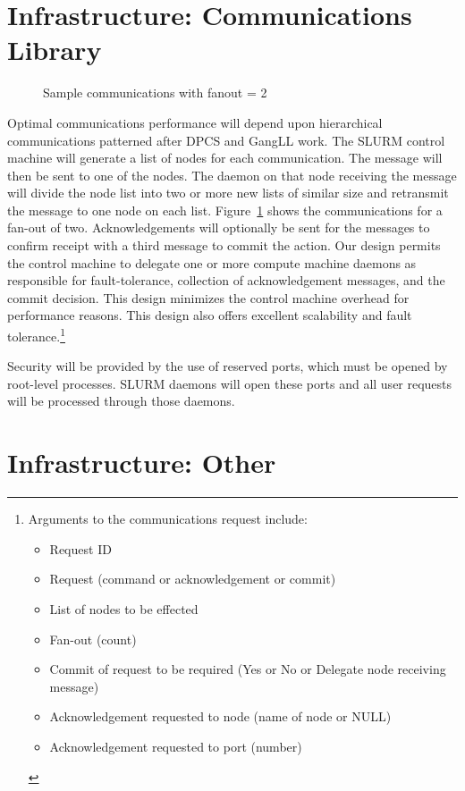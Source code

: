 \section{Infrastructure: Communications Library}

\begin{figure}
\caption{Sample communications with fanout = 2}
\label{communicate}
\end{figure}
Optimal communications performance will depend upon hierarchical communications
patterned after DPCS and GangLL work. The SLURM control machine will generate a
list of nodes for each communication. The message will then be sent to one of
the nodes. 
The daemon on that node receiving the message will divide the node list into
two or more new lists of similar size and retransmit the message to one node on
each list. Figure~\ref{communicate} shows the communications for a fan-out of 
two.  Acknowledgements will optionally be sent for the messages to confirm 
receipt with a third message to commit the action. Our design permits the 
control machine to delegate one or more compute machine daemons as responsible 
for fault-tolerance, collection of acknowledgement messages, and the commit
decision. This design minimizes the control machine overhead for performance
reasons. This design also offers excellent scalability and fault 
tolerance.\footnote{Arguments to the communications request include:
\begin{itemize}
\item Request ID
\item Request (command or acknowledgement or commit)
\item List of nodes to be effected
\item Fan-out (count)
\item Commit of request to be required (Yes or No or Delegate node receiving
      message) 
\item Acknowledgement requested to node (name of node or NULL)
\item Acknowledgement requested to port (number)
\end{itemize} }

Security will be provided by the use of reserved ports, which must be opened by
root-level processes. SLURM daemons will open these ports and all user requests
will be processed through those daemons. 

\section{Infrastructure: Other}

